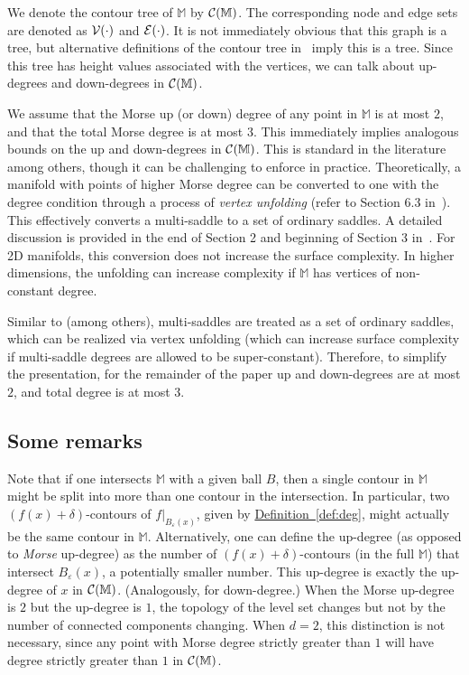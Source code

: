 \documentclass[11pt]{article}
\theoremstyle{definition}
\newcommand{\cC}{{\cal C}}
\newcommand{\cE}{{\cal E}}
\newcommand{\cV}{{\cal V}}
\newcommand{\MM}{\mathbb{M}}
\newcommand{\eps}{\varepsilon}
\newcommand{\Def}[1]{\hyperref[def:#1]{Definition~\ref*{def:#1}}} %
\newcommand{\reeb}{\cC}
\begin{document}
We denote the contour tree of $\MM$
by $\reeb(\MM)$. The corresponding node and edge sets are denoted as $\cV(\cdot)$ and $\cE(\cdot)$.
It is not immediately obvious that this graph is a tree, but alternative definitions of the contour tree
in~\cite{csa-cctad-03} imply this is a tree. 
Since this tree has height values associated with the vertices, we can talk about up-degrees and down-degrees in $\reeb(\MM)$.
%

We assume that the Morse up (or down) degree of any point
in $\MM$ is at most $2$, and that the total Morse degree
is at most $3$. This immediately implies analogous bounds
on the up and down-degrees in $\reeb(\MM)$. This
is standard in the literature
among others, though it can be challenging to enforce in 
practice. Theoretically, a manifold with points of higher Morse degree
can be converted to one with the degree condition through
a process of \emph{vertex unfolding} (refer to
Section 6.3 in~\cite{HaEd10}). This effectively converts
a multi-saddle to a set of ordinary saddles.
A detailed discussion is provided in the end
of Section 2 and beginning of Section 3 in~\cite{BaKr+98}.
 For 2D manifolds,
this conversion does not increase the surface complexity.
In higher dimensions, the unfolding can increase complexity if
$\MM$ has vertices of non-constant degree.


Similar to \cite{kobps-ctsssit-97} (among others), multi-saddles are treated as a set of ordinary saddles, which can be realized 
via vertex unfolding (which can increase surface complexity if multi-saddle degrees are allowed to be super-constant).
Therefore, to simplify the presentation, for the remainder of the paper up and down-degrees are at most $2$, and total degree is at most $3$.
%



\subsection{Some remarks}
Note that if one intersects $\MM$ with a given ball $B$, then a single contour in $\MM$ might be split into more than one contour in the intersection. 
In particular, two $(f(x)+\delta)$-contours of $f|_{B_\eps(x)}$, given by \Def{deg}, might actually be the same contour in $\MM$. 
Alternatively, one can define the up-degree (as opposed to \emph{Morse} up-degree) as the number of $(f(x)+\delta)$-contours (in the full $\MM$)
that intersect $B_\eps(x)$, a potentially smaller number. This up-degree
is exactly the up-degree of $x$ in $\reeb(\MM)$. (Analogously, for down-degree.)
When the Morse up-degree is $2$ but the up-degree is $1$, the topology of the level set changes but not by the number of connected components changing.
When $d=2$, this distinction is not necessary, since any point with Morse degree strictly greater than $1$ will have degree strictly greater than $1$ in $\reeb(\MM)$.
\end{document}
